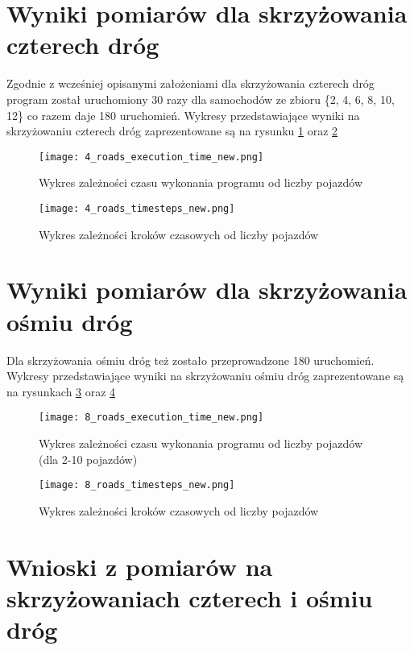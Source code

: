 \section{Wyniki pomiarów dla skrzyżowania czterech dróg}

Zgodnie z wcześniej opisanymi założeniami dla skrzyżowania czterech dróg program został uruchomiony 30 razy dla samochodów ze zbioru \{2, 4, 6, 8, 10, 12\} co razem daje 180 uruchomień.
\newline
\newline
Wykresy przedstawiające wyniki na skrzyżowaniu czterech dróg zaprezentowane są na rysunku \ref{4_roads_execution_time_new} oraz \ref{four-roads-crossroads-timesteps}
\begin{figure}[H]
  \centering
  \texttt{[image: 4\_roads\_execution\_time\_new.png]}
  \caption{Wykres zależności czasu wykonania programu od liczby pojazdów}
  \label{4_roads_execution_time_new}
\end{figure}
\begin{figure}[H]
  \centering
  \texttt{[image: 4\_roads\_timesteps\_new.png]}
  \caption{Wykres zależności kroków czasowych od liczby pojazdów}
  \label{four-roads-crossroads-timesteps}
\end{figure}

\section{Wyniki pomiarów dla skrzyżowania ośmiu dróg}

Dla skrzyżowania ośmiu dróg też zostało przeprowadzone 180 uruchomień.
\newline
\newline
Wykresy przedstawiające wyniki na skrzyżowaniu ośmiu dróg zaprezentowane są na rysunkach \ref{8_roads_execution_time_new} oraz \ref{8_roads_timesteps_new}
\begin{figure}[H]
  \centering
  \texttt{[image: 8\_roads\_execution\_time\_new.png]}
  \caption{Wykres zależności czasu wykonania programu od liczby pojazdów (dla 2-10 pojazdów)}
  \label{8_roads_execution_time_new}
\end{figure}
\begin{figure}[H]
  \centering
  \texttt{[image: 8\_roads\_timesteps\_new.png]}
  \caption{Wykres zależności kroków czasowych od liczby pojazdów}
  \label{8_roads_timesteps_new}
\end{figure}

\section{Wnioski z pomiarów na skrzyżowaniach czterech i ośmiu dróg}

